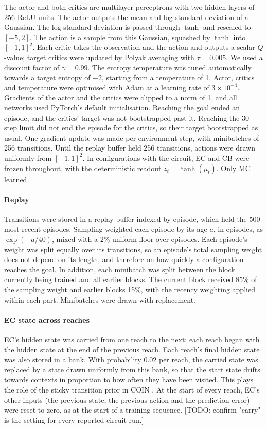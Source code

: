 The actor and both critics are multilayer perceptrons with two hidden layers of 256 ReLU units. The actor outputs the mean and log standard deviation of a Gaussian. The log standard deviation is passed through $\tanh$ and rescaled to $[-5, 2]$. The action is a sample from this Gaussian, squashed by $\tanh$ into $[-1, 1]^2$. Each critic takes the observation and the action and outputs a scalar $Q$-value; target critics were updated by Polyak averaging with $\tau = 0.005$. We used a discount factor of $\gamma = 0.99$. The entropy temperature was tuned automatically \citep{haarnoja2018soft} towards a target entropy of $-2$, starting from a temperature of 1. Actor, critics and temperature were optimised with Adam at a learning rate of $3 \times 10^{-4}$. Gradients of the actor and the critics were clipped to a norm of 1, and all networks used PyTorch's default initialisation. Reaching the goal ended an episode, and the critics' target was not bootstrapped past it. Reaching the 30-step limit did not end the episode for the critics, so their target bootstrapped as usual. One gradient update was made per environment step, with minibatches of 256 transitions. Until the replay buffer held 256 transitions, actions were drawn uniformly from $[-1, 1]^2$. In configurations with the circuit, EC and CB were frozen throughout, with the deterministic readout $z_t = \tanh(\mu_t)$. Only MC learned.

\paragraph{Replay}
Transitions were stored in a replay buffer indexed by episode, which held the 500 most recent episodes. Sampling weighted each episode by its age $a$, in episodes, as $\exp(-a / 40)$, mixed with a 2\% uniform floor over episodes. Each episode's weight was split equally over its transitions, so an episode's total sampling weight does not depend on its length, and therefore on how quickly a configuration reaches the goal. In addition, each minibatch was split between the block currently being trained and all earlier blocks. The current block received 85\% of the sampling weight and earlier blocks 15\%, with the recency weighting applied within each part. Minibatches were drawn with replacement.

\paragraph{EC state across reaches}
EC's hidden state was carried from one reach to the next: each reach began with the hidden state at the end of the previous reach. Each reach's final hidden state was also stored in a bank. With probability $0.02$ per reach, the carried state was replaced by a state drawn uniformly from this bank, so that the start state drifts towards contexts in proportion to how often they have been visited. This plays the role of the sticky transition prior in COIN \citep{heald2021contextual}. At the start of every reach, EC's other inputs (the previous state, the previous action and the prediction error) were reset to zero, as at the start of a training sequence. [TODO: confirm "carry" is the setting for every reported circuit run.]

